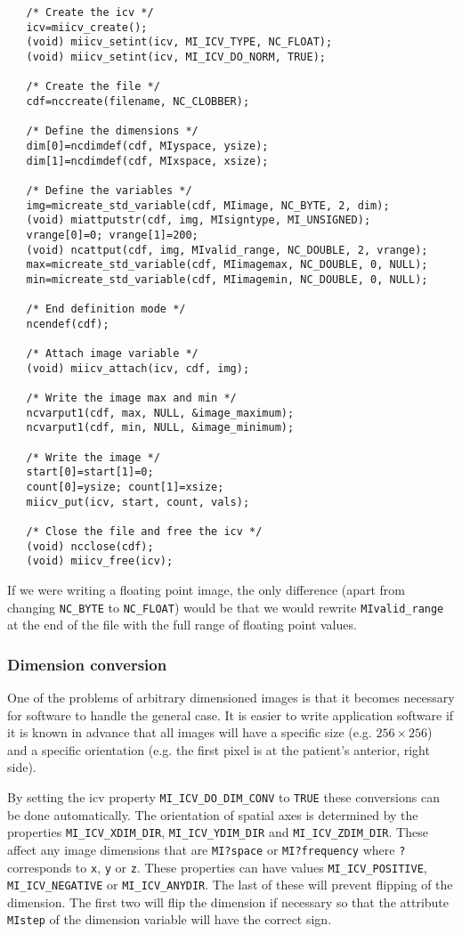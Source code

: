 \begin{verbatim}
   /* Create the icv */
   icv=miicv_create();
   (void) miicv_setint(icv, MI_ICV_TYPE, NC_FLOAT);
   (void) miicv_setint(icv, MI_ICV_DO_NORM, TRUE);

   /* Create the file */
   cdf=nccreate(filename, NC_CLOBBER);

   /* Define the dimensions */
   dim[0]=ncdimdef(cdf, MIyspace, ysize);
   dim[1]=ncdimdef(cdf, MIxspace, xsize);

   /* Define the variables */
   img=micreate_std_variable(cdf, MIimage, NC_BYTE, 2, dim);
   (void) miattputstr(cdf, img, MIsigntype, MI_UNSIGNED);
   vrange[0]=0; vrange[1]=200;
   (void) ncattput(cdf, img, MIvalid_range, NC_DOUBLE, 2, vrange);
   max=micreate_std_variable(cdf, MIimagemax, NC_DOUBLE, 0, NULL);
   min=micreate_std_variable(cdf, MIimagemin, NC_DOUBLE, 0, NULL);

   /* End definition mode */
   ncendef(cdf);

   /* Attach image variable */
   (void) miicv_attach(icv, cdf, img);

   /* Write the image max and min */
   ncvarput1(cdf, max, NULL, &image_maximum);
   ncvarput1(cdf, min, NULL, &image_minimum);

   /* Write the image */
   start[0]=start[1]=0;
   count[0]=ysize; count[1]=xsize;
   miicv_put(icv, start, count, vals);

   /* Close the file and free the icv */
   (void) ncclose(cdf);
   (void) miicv_free(icv);
\end{verbatim}

If we were writing a floating point image, the only difference (apart
from changing \verb+NC_BYTE+ to \verb+NC_FLOAT+) would be that we
would rewrite \verb+MIvalid_range+ at the end of the file with the
full range of floating point values.

\subsubsection{Dimension conversion}

One of the problems of arbitrary dimensioned images is that it becomes
necessary for software to handle the general case. It is easier to write
application software if it is known in advance that all images will
have a specific size (e.g. $256\times 256$) and a specific orientation
(e.g. the first pixel is at the patient's anterior, right side). 

By setting the icv property \verb+MI_ICV_DO_DIM_CONV+ to \verb+TRUE+
these conversions can be done automatically. The orientation of
spatial axes is determined by the properties \verb+MI_ICV_XDIM_DIR+,
\verb+MI_ICV_YDIM_DIR+ and \verb+MI_ICV_ZDIM_DIR+. These affect any
image dimensions that are \verb+MI?space+ or \verb+MI?frequency+ where
\verb+?+ corresponds to \verb+x+, \verb+y+ or \verb+z+. These
properties can have values \verb+MI_ICV_POSITIVE+,
\verb+MI_ICV_NEGATIVE+ or \verb+MI_ICV_ANYDIR+. The last of these will
prevent flipping of the dimension. The first two will flip the
dimension if necessary so that the attribute \verb+MIstep+ of the
dimension variable will have the correct sign.

